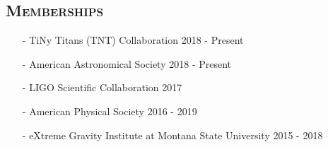 \documentclass[margin]{res}
\begin{document}
\begin{resume}
 \bigskip



\section{\textsc{Memberships}} 
\begin{itemize}
\item[-] TiNy Titans (TNT) Collaboration \hfill 2018 - Present
\item[-] American Astronomical Society \hfill 2018 - Present
\item[-] LIGO Scientific Collaboration \hfill 2017
\item[-] American Physical Society \hfill 2016 - 2019
\item[-] eXtreme Gravity Institute at Montana State University \hfill 2015 - 2018
\end{itemize}
 \bigskip
 
%
%

\end{resume}
\end{document}
